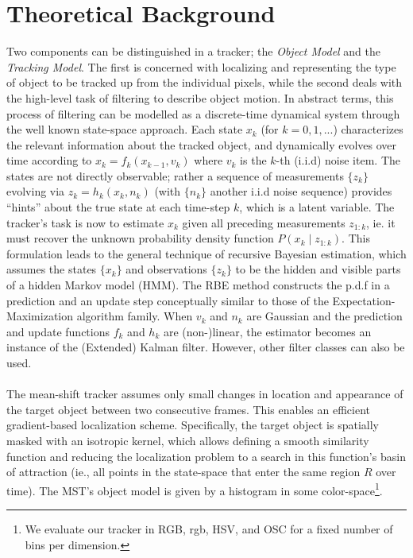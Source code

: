 \documentclass[a4paper,11pt]{article}
\begin{document}
	\section*{Theoretical Background}
		Two components can be distinguished in a tracker; the \textit{Object Model}
		and the \textit{Tracking Model}. The first is concerned with localizing and
		representing the type of object to be tracked up from the individual pixels,
		while the second deals with the high-level task of filtering to describe object
		motion.
		In abstract terms, this process of filtering can be modelled as a discrete-time
		dynamical system through the well known state-space approach. Each state $x_k$
		(for $k=0, 1, ...$) characterizes the relevant information about the tracked
		object, and dynamically evolves over time according to $x_k = f_k(x_{k - 1}, v_k)$
		where $v_k$ is the $k$-th (i.i.d) noise item. The states are not directly observable;
		rather a sequence of measurements $\{z_k\}$ evolving via $z_k = h_k(x_k, n_k)$
		(with $\{n_k\}$ another i.i.d noise sequence) provides ``hints'' about the true
		state at each time-step $k$, which is a latent variable. The tracker's task
		is now to estimate $x_k$ given all preceding measurements $z_{1:k}$, ie. it
		must recover the unknown probability density function $P(x_k \mid z_{1:k})$.
		This formulation leads to the general technique of recursive Bayesian estimation,
		which assumes the states $\{x_k\}$ and observations $\{z_k\}$ to be the hidden
		and visible parts of a hidden Markov model (HMM). The RBE method constructs the
		p.d.f in a prediction and an update step conceptually similar to those of the
		Expectation-Maximization algorithm family. When $v_k$ and $n_k$ are Gaussian
		and the prediction and update functions $f_k$ and $h_k$ are (non-)linear, the
		estimator becomes an instance of the (Extended) Kalman filter. However, other
		filter classes can also be used.
		\\ \\
		The mean-shift tracker assumes only small changes in location and appearance
		of the target object between two consecutive frames. This enables an efficient
		gradient-based localization scheme. Specifically, the target object is spatially
		masked with an isotropic kernel, which allows defining a smooth similarity function
		and reducing the localization problem to a search in this function's basin of attraction
		(ie., all points in the state-space that enter the same region $R$ over time). The MST's
		object model is given by a histogram in some color-space\footnote{We evaluate our tracker
		in RGB, rgb, HSV, and OSC for a fixed number of bins per dimension.}.
\end{document}
